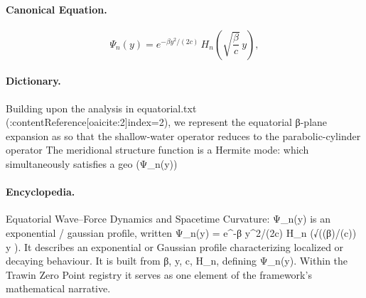 \paragraph{Canonical Equation.}
\[
\Psi_n(y) = e^{-\beta y^2/(2c)} \,H_n\!\left(\sqrt{\frac{\beta}{c}}\,y\right),
\]

\paragraph{Dictionary.}
Building upon the analysis in equatorial.txt (:contentReference[oaicite:2]index=2), we represent the equatorial β-plane expansion as so that the shallow-water operator reduces to the parabolic-cylinder operator The meridional structure function is a Hermite mode: which simultaneously satisfies a geo (Ψ\_n(y))

\paragraph{Encyclopedia.}
Equatorial Wave–Force Dynamics and Spacetime Curvature: Ψ\_n(y) is an exponential / gaussian profile, written Ψ\_n(y) = e\textasciicircum{}-β y\textasciicircum{}2/(2c) H\_n (√((β)/(c)) y ). It describes an exponential or Gaussian profile characterizing localized or decaying behaviour. It is built from β, y, c, H\_n, defining Ψ\_n(y). Within the Trawin Zero Point registry it serves as one element of the framework's mathematical narrative.
